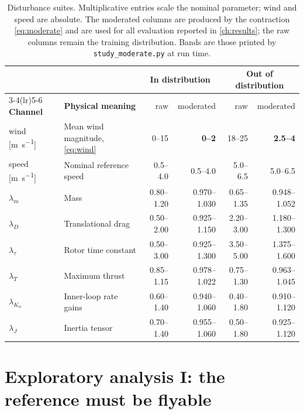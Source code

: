 \documentclass[11pt,a4paper,twoside,openright]{report}
\theoremstyle{plain}
\theoremstyle{definition}
\theoremstyle{remark}
\begin{document}
	\begin{table}[htbp]
		\centering
		\caption{Disturbance suites. Multiplicative entries scale the nominal parameter;
			wind and speed are absolute. The moderated columns are produced by the
			contraction \cref{eq:moderate} and are used for all evaluation reported in
			\cref{ch:results}; the raw columns remain the training distribution. Bands
			are those printed by \texttt{study\_moderate.py} at run time.}
		\label{tab:dist}
		\small
		\begin{tabularx}{\linewidth}{@{}l X r r r r@{}}
			\toprule
			& & \multicolumn{2}{c}{\textbf{In distribution}} & \multicolumn{2}{c}{\textbf{Out of distribution}} \\
			\cmidrule(lr){3-4}\cmidrule(lr){5-6}
			\textbf{Channel} & \textbf{Physical meaning} & raw & moderated & raw & moderated \\
			\midrule
			wind [\si{\metre\per\second}] & Mean wind magnitude, \cref{eq:wind} & 0--15 & \textbf{0--2} & 18--25 & \textbf{2.5--4} \\
			speed [\si{\metre\per\second}] & Nominal reference speed & 0.5--4.0 & 0.5--4.0 & 5.0--6.5 & 5.0--6.5 \\
			$\lambda_m$ & Mass & 0.80--1.20 & 0.970--1.030 & 0.65--1.35 & 0.948--1.052 \\
			$\lambda_D$ & Translational drag & 0.50--2.00 & 0.925--1.150 & 2.20--3.00 & 1.180--1.300 \\
			$\lambda_\tau$ & Rotor time constant & 0.50--3.00 & 0.925--1.300 & 3.50--5.00 & 1.375--1.600 \\
			$\lambda_{T}$ & Maximum thrust & 0.85--1.15 & 0.978--1.022 & 0.75--1.30 & 0.963--1.045 \\
			$\lambda_{K_w}$ & Inner-loop rate gains & 0.60--1.40 & 0.940--1.060 & 0.40--1.80 & 0.910--1.120 \\
			$\lambda_J$ & Inertia tensor & 0.70--1.40 & 0.955--1.060 & 0.50--1.80 & 0.925--1.120 \\
			\bottomrule
		\end{tabularx}
	\end{table}

	\section{Exploratory analysis I: the reference must be flyable}
\end{document}
